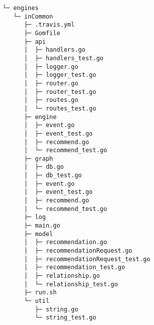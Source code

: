 \begin{codebox}
\begin{verbatim}
└─ engines
   └─ inCommon
      ├─ .travis.yml
      ├─ Gomfile
      ├─ api
      │  ├─ handlers.go
      │  ├─ handlers_test.go
      │  ├─ logger.go
      │  ├─ logger_test.go
      │  ├─ router.go
      │  ├─ router_test.go
      │  ├─ routes.go
      │  └─ routes_test.go
      ├─ engine
      │  ├─ event.go
      │  ├─ event_test.go
      │  ├─ recommend.go
      │  └─ recommend_test.go
      ├─ graph
      │  ├─ db.go
      │  ├─ db_test.go
      │  ├─ event.go
      │  ├─ event_test.go
      │  ├─ recommend.go
      │  └─ recommend_test.go
      ├─ log
      ├─ main.go
      ├─ model
      │  ├─ recommendation.go
      │  ├─ recommendationRequest.go
      │  ├─ recommendationRequest_test.go
      │  ├─ recommendation_test.go
      │  ├─ relationship.go
      │  └─ relationship_test.go
      ├─ run.sh
      └─ util
         ├─ string.go
         └─ string_test.go

\end{verbatim}
\end{codebox}

